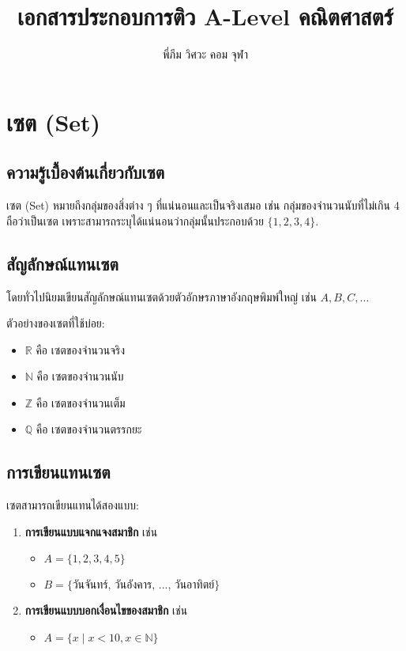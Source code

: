 \documentclass[a4paper,12pt]{article}
\begin{document}
\title{เอกสารประกอบการติว A-Level คณิตศาสตร์}
\author{พี่ภีม วิศวะ คอม จุฬา}
\date{}
\maketitle

\section{เซต (Set)}

\subsection{ความรู้เบื้องต้นเกี่ยวกับเซต}
เซต (Set) หมายถึงกลุ่มของสิ่งต่าง ๆ ที่แน่นอนและเป็นจริงเสมอ เช่น กลุ่มของจำนวนนับที่ไม่เกิน 4 ถือว่าเป็นเซต 
เพราะสามารถระบุได้แน่นอนว่ากลุ่มนั้นประกอบด้วย $\{1,2,3,4\}$.

\subsection{สัญลักษณ์แทนเซต}
โดยทั่วไปนิยมเขียนสัญลักษณ์แทนเซตด้วยตัวอักษรภาษาอังกฤษพิมพ์ใหญ่ เช่น $A, B, C, \dots$

ตัวอย่างของเซตที่ใช้บ่อย:
\begin{itemize}
    \item $\mathbb{R}$ คือ เซตของจำนวนจริง
    \item $\mathbb{N}$ คือ เซตของจำนวนนับ
    \item $\mathbb{Z}$ คือ เซตของจำนวนเต็ม
    \item $\mathbb{Q}$ คือ เซตของจำนวนตรรกยะ
\end{itemize}

\subsection{การเขียนแทนเซต}
เซตสามารถเขียนแทนได้สองแบบ:
\begin{enumerate}
    \item \textbf{การเขียนแบบแจกแจงสมาชิก} เช่น
          \begin{itemize}
              \item $A = \{1,2,3,4,5\}$
              \item $B = \{\text{วันจันทร์, วันอังคาร, ..., วันอาทิตย์}\}$
          \end{itemize}
    \item \textbf{การเขียนแบบบอกเงื่อนไขของสมาชิก} เช่น
          \begin{itemize}
              \item $A = \{x \mid x < 10, x \in \mathbb{N} \}$
          \end{itemize}
\end{enumerate}
\end{document}
